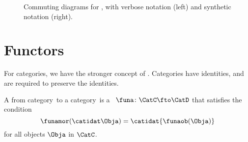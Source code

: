 \vfill

\begin{figure*}[h!]
    \caption{
        Commuting diagrams for , with verbose notation (left) and synthetic notation (right).
    }
\end{figure*}

\vspace{2cm}



\section{Functors}
\label{sec:functors}

For categories, we have the stronger concept of .
Categories have identities, and  are required to preserve the identities.

\begin{ctdefinition}[Functor]
    \label{def:functor}
    A  from category~\CatC to a category~\CatD is a ~$\funa\colon \CatC \fto \CatD$
    that satisfies the condition
    \begin{equation}
        \label{eq:functor-condition}
        \funamor(\catidat\Obja)=\catidat{\funaob(\Obja)}
    \end{equation}
    for all objects $\Obja$ in $\CatC$.
\end{ctdefinition}


